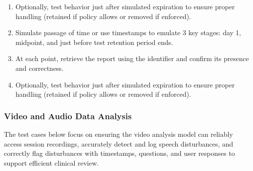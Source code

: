 \documentclass[12pt, titlepage]{article}
\begin{document}
\begin{itemize}
\begin{mdframed}[linewidth=0.5mm]
\begin{enumerate}[noitemsep]
        \item Optionally, test behavior just after simulated expiration to ensure proper handling (retained if policy allows or removed if enforced).
        \item Simulate passage of time or use timestamps to emulate 3 key stages: day 1, midpoint, and just before test retention period ends.
        \item At each point, retrieve the report using the identifier and confirm its presence and correctness.
        \item Optionally, test behavior just after simulated expiration to ensure proper handling (retained if policy allows or removed if enforced).
      \end{enumerate}
  \end{mdframed}
\end{itemize}

\subsubsection{Video and Audio Data Analysis}

\hspace{2em}The test cases below focus on ensuring the video analysis model can reliably access 
session recordings, accurately detect and log speech disturbances, and correctly flag 
disturbances with timestamps, questions, and user responses to support efficient clinical review.
\end{document}
